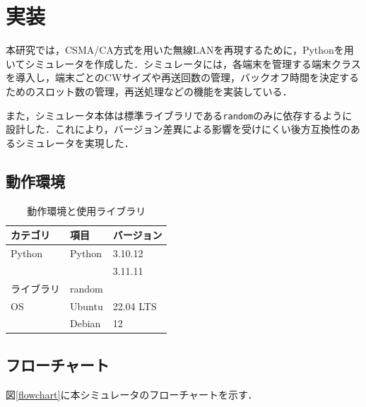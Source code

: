 \documentclass[a4paper,10pt]{ltjsarticle}
\begin{document}
\clearpage
\section{実装}

本研究では，CSMA/CA方式を用いた無線LANを再現するために，Pythonを用いてシミュレータを作成した．シミュレータには，各端末を管理する端末クラスを導入し，端末ごとのCWサイズや再送回数の管理，バックオフ時間を決定するためのスロット数の管理，再送処理などの機能を実装している．

また，シミュレータ本体は標準ライブラリである\texttt{random}のみに依存するように設計した．これにより，バージョン差異による影響を受けにくい後方互換性のあるシミュレータを実現した．


\subsection{動作環境}

\begin{table}[h]
  \centering
  \caption{動作環境と使用ライブラリ}
  \label{tab:env}
  \begin{tabular}{lll}
      \hline
      \textbf{カテゴリ} & \textbf{項目} & \textbf{バージョン} \\ \hline
      Python           & Python        & 3.10.12 \\ 
      &               & 3.11.11 \\ \hline
      ライブラリ       & random         & \\ \hline
      OS               & Ubuntu        & 22.04 LTS \\ 
                       & Debian        & 12 \\ \hline
  \end{tabular}
\end{table}



\subsection{フローチャート}
図\ref{flowchart}に本シミュレータのフローチャートを示す．
\end{document}
